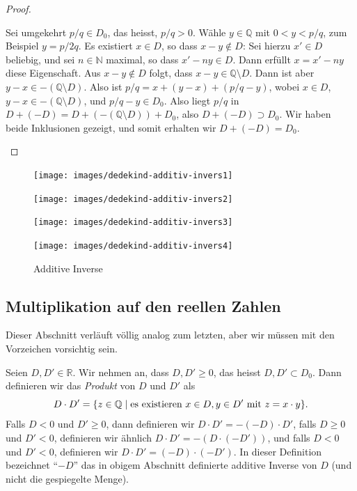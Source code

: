 \documentclass[../main.tex]{subfiles}
\begin{document}
\begin{proof}
\begin{itemize}
      Sei umgekehrt
      $p/q \in D_{0}$, das heisst, $p/q > 0$. Wähle $y \in \mathbb Q$
      mit $0 < y < p/q$, zum Beispiel $y = p/2q$.
      Es existiert $x \in D$, so dass $x - y \notin D$:
      Sei hierzu $x' \in D$ beliebig, und sei $n \in \mathbb N$ maximal,
      so dass $x' -ny \in D$. Dann erfüllt $x = x' - ny$ diese Eigenschaft.
      Aus $x - y \notin D$ folgt, dass $x- y \in \mathbb Q \setminus D$.
      Dann ist aber $y - x \in - (\mathbb Q \setminus D)$.
      Also ist $p/q = x + (y-x) + (p/q - y)$, wobei
      $x \in D$, $y - x \in -(\mathbb Q \setminus D)$, und $p/q - y \in D_{0}$.
      Also liegt $p/q$ in $D + (-D) = D + (-(\mathbb Q \setminus D)) + D_{0}$,
      also $D + (-D) \supset D_{0}$. Wir haben beide Inklusionen gezeigt,
      und somit
      erhalten wir $D + (-D) = D_{0}$. \qedhere
  \end{itemize}
\end{proof}

\begin{figure}[htb]
  \centering
  \begin{minipage}{0.4\linewidth}
    \centering
    \texttt{[image: images/dedekind-additiv-invers1]}
  \end{minipage}%
  \begin{minipage}{0.4\linewidth}
    \centering
    \texttt{[image: images/dedekind-additiv-invers2]}
  \end{minipage}
  \begin{minipage}{0.4\linewidth}
    \centering
    \texttt{[image: images/dedekind-additiv-invers3]}
  \end{minipage}%
  \begin{minipage}{0.4\linewidth}
    \centering
    \texttt{[image: images/dedekind-additiv-invers4]}
  \end{minipage}
  \caption{Additive Inverse}%
  \label{fig:additiv-dedekind}
\end{figure}

\subsection*{Multiplikation auf den reellen Zahlen}
Dieser Abschnitt verläuft völlig analog zum letzten,
aber wir müssen mit den Vorzeichen vorsichtig sein.

\begin{definition}
Seien
$D ,D' \in \mathbb R$. Wir nehmen an, dass $D, D' \geq 0$,
das heisst $D, D' \subset D_{0}$. Dann definieren wir das \emph{Produkt}
von $D$ und $D'$ als
\[D \cdot D' = \{z \in \mathbb Q \mid \textup{es existieren } x \in D,
  y \in D' \textup{ mit } z = x \cdot y\}.\]
Falls $D < 0$ und $D' \geq 0$, dann definieren wir
\(D \cdot D' = -(-D) \cdot D'\),
falls $D \geq 0$ und $D' < 0$, definieren wir ähnlich
\(D \cdot D' = -(D \cdot (-D'))\),
und falls $D < 0$ und $D' < 0$, definieren wir
\(D \cdot D' = (-D) \cdot (-D')\).
In dieser Definition bezeichnet ``$-D$'' das in obigem Abschnitt
definierte additive Inverse von $D$ (und nicht die gespiegelte Menge).
\end{definition}
\end{document}
